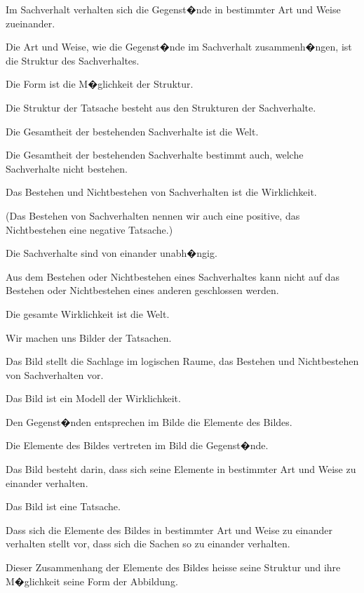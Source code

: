 {Im Sachverhalt verhalten sich die Gegenst�nde
in bestimmter Art und Weise zueinander.}


{Die Art und Weise, wie die Gegenst�nde im
Sachverhalt zusammenh�ngen, ist die Struktur
des Sachverhaltes.}


{Die Form ist die M�glichkeit der Struktur.}


{Die Struktur der Tatsache besteht aus den
Strukturen der Sachverhalte.}


{Die Gesamtheit der bestehenden Sachverhalte
ist die Welt.}


{Die Gesamtheit der bestehenden Sachverhalte
bestimmt auch, welche Sachverhalte nicht bestehen.}


{Das Bestehen und Nichtbestehen von Sachverhalten
ist die Wirklichkeit.

(Das Bestehen von Sachverhalten nennen wir
auch eine positive, das Nichtbestehen eine negative
Tatsache.)}


{Die Sachverhalte sind von einander unabh�ngig.}


{Aus dem Bestehen oder Nichtbestehen eines
Sachverhaltes kann nicht auf das Bestehen oder
Nichtbestehen eines anderen geschlossen werden.}


{Die gesamte Wirklichkeit ist die Welt.}


{Wir machen uns Bilder der Tatsachen.}


{Das Bild stellt die Sachlage im logischen Raume,
das Bestehen und Nichtbestehen von Sachverhalten
vor.}


{Das Bild ist ein Modell der Wirklichkeit.}


{Den Gegenst�nden entsprechen im Bilde die
Elemente des Bildes.}


{Die Elemente des Bildes vertreten im Bild die
Gegenst�nde.}


{Das Bild besteht darin, dass sich seine Elemente
in bestimmter Art und Weise zu einander verhalten.}


{Das Bild ist eine Tatsache.}


{Dass sich die Elemente des Bildes in bestimmter
Art und Weise zu einander verhalten stellt vor,
dass sich die Sachen so zu einander verhalten.

Dieser Zusammenhang der Elemente des Bildes
heisse seine Struktur und ihre M�glichkeit seine
Form der Abbildung.}


